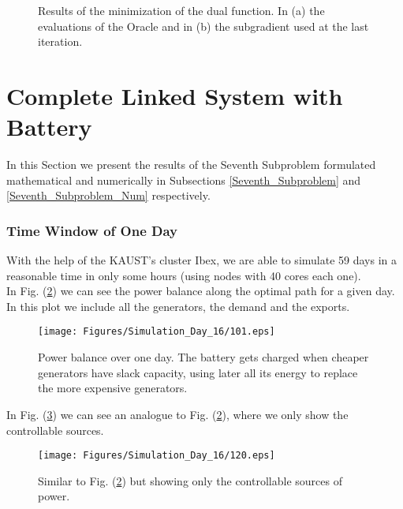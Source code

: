 \begin{figure}[H]
\centering
{}\qquad
{}
\caption{Results of the minimization of the dual function. In (a) the evaluations of the Oracle and in (b) the subgradient used at the last iteration.}
\label{Plot_SP6_2}
\end{figure}

\section{Complete Linked System with Battery} \label{Seventh_Subproblem_Results}

In this Section we present the results of the Seventh Subproblem formulated mathematical and numerically in Subsections \ref{Seventh_Subproblem} and \ref{Seventh_Subproblem_Num} respectively.\\

\subsubsection{Time Window of One Day}

With the help of the KAUST's cluster Ibex, we are able to simulate 59 days in a reasonable time in only some hours (using nodes with 40 cores each one).\\

In Fig. (\ref{Plot_SP7_0}) we can see the power balance along the optimal path for a given day. In this plot we include all the generators, the demand and the exports.

\begin{figure}[H]
\centering
\texttt{[image: Figures/Simulation\_Day\_16/101.eps]}
\caption{Power balance over one day. The battery gets charged when cheaper generators have slack capacity, using later all its energy to replace the more expensive generators.}
\label{Plot_SP7_0}
\end{figure}

In Fig. (\ref{Plot_SP7_1}) we can see an analogue to Fig. (\ref{Plot_SP7_0}), where we only show the controllable sources. 

\begin{figure}[H]
\centering
\texttt{[image: Figures/Simulation\_Day\_16/120.eps]}
\caption{Similar to Fig. (\ref{Plot_SP7_0}) but showing only the controllable sources of power.}
\label{Plot_SP7_1}
\end{figure}

